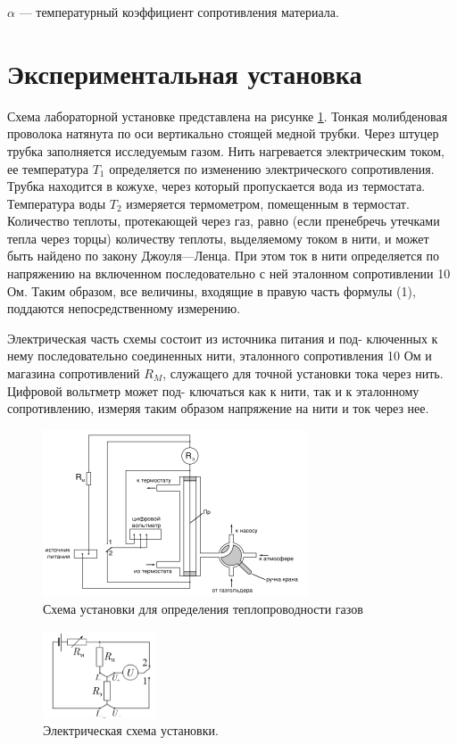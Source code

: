 \documentclass[a4paper,12pt]{article}
\begin{document}
$\alpha$ --- температурный коэффициент сопротивления материала.

\section{Экспериментальная установка}
Схема лабораторной установке представлена на рисунке \ref{fig:setup}. Тонкая молибденовая проволока натянута по оси вертикально стоящей медной трубки. Через штуцер трубка заполняется исследуемым газом. Нить нагревается электрическим током, ее температура $T_1$ определяется по изменению электрического сопротивления. Трубка находится в кожухе, через который пропускается вода из термостата. Температура воды $T_2$ измеряется термометром, помещенным в термостат. Количество теплоты,
протекающей через газ, равно (если пренебречь утечками тепла через торцы) количеству теплоты, выделяемому током в нити, и может быть найдено по закону Джоуля—Ленца. При этом ток в нити определяется по напряжению на включенном последовательно с ней эталонном сопротивлении 10 Ом. Таким образом, все величины, входящие в правую часть формулы (1), поддаются непосредственному измерению. \par
Электрическая часть схемы состоит из источника питания и под-
ключенных к нему последовательно соединенных нити, эталонного
сопротивления 10 Ом и магазина сопротивлений $R_M$, служащего для
точной установки тока через нить. Цифровой вольтметр может под-
ключаться как к нити, так и к эталонному сопротивлению, измеряя
таким образом напряжение на нити и ток через нее.

\begin{figure}[H]
  \centering
  \includegraphics[width=0.7\textwidth]{data/setup.png}
  \caption{Схема установки для определения теплопроводности газов\label{fig:setup}}
\end{figure}

\begin{figure}[H]
  \centering
  \includegraphics[width=0.3\textwidth]{data/circuit_fig.png}
  \caption{Электрическая схема установки.} \label{fig:circuit}
\end{figure}
\end{document}
